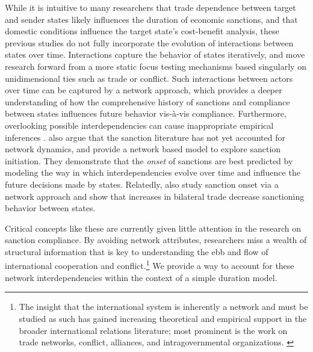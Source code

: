 While it is intuitive to many researchers that trade dependence between target and sender states likely influences the duration of economic sanctions, and that domestic conditions influence the target state's cost-benefit analysis, these previous studies do not fully incorporate the evolution of interactions between states over time. Interactions capture the  behavior of states iteratively, and move research forward from a more static focus testing mechanisms based singularly on unidimensional ties such as trade or conflict. Such interactions between actors over time can be captured by a network approach, which provides a deeper understanding of how the comprehensive history of sanctions and compliance between states influences future behavior vis-\`a-vis compliance. Furthermore, overlooking possible interdependencies can cause inappropriate empirical inferences \citep{erikson2014dyadic}. \citet{cranmer2014reciprocity} also argue that the sanction literature has not yet accounted for network dynamics, and provide a network based model to explore sanction initiation. They demonstrate that the \textit{onset} of sanctions are best predicted by modeling the way in which interdependencies evolve over time and influence the future decisions made by states. Relatedly, \citet{hafner2008} also study sanction onset via a network approach and show that increases in bilateral trade decrease sanctioning behavior between states.

Critical concepts like these are currently given little attention in the research on sanction compliance. By avoiding network attributes, researchers miss a wealth of structural information that is key to understanding the ebb and flow of international cooperation and conflict.\footnote{The insight that the international system is inherently a network and must be studied as such has gained increasing theoretical and empirical support in the broader international relations literature; most prominent is the work on trade networks,\cite{hoff2004modeling, ward:rainbow:2013} conflict,\cite{ward2007disputes} alliances, \cite{warren2010geometry} and intragovernmental organizations. \cite{cao2009networks,greenhill2010company}} We provide a way to account for these network interdependencies within the context of a simple duration model.

